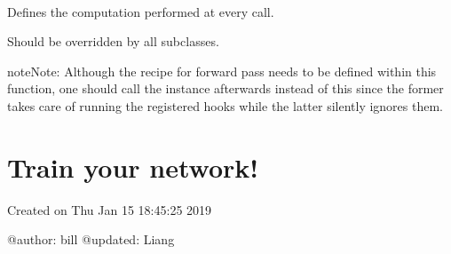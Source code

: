 \documentclass[letterpaper,10pt,english]{sphinxmanual}
\begin{document}

\begin{fulllineitems}
\label{\detokenize{usage/quickstart:unet.UNet_up_block}}~

\begin{fulllineitems}
\label{\detokenize{usage/quickstart:unet.UNet_up_block.forward}}
Defines the computation performed at every call.

Should be overridden by all subclasses.

\begin{sphinxadmonition}{note}{Note:}
Although the recipe for forward pass needs to be defined within
this function, one should call the  instance afterwards
instead of this since the former takes care of running the
registered hooks while the latter silently ignores them.
\end{sphinxadmonition}

\end{fulllineitems}


\end{fulllineitems}



\chapter{Train your network!}
\label{\detokenize{usage/train:module-train_unet}}\label{\detokenize{usage/train:train-your-network}}\label{\detokenize{usage/train::doc}}
Created on Thu Jan 15 18:45:25 2019

@author: bill
@updated: Liang
\end{document}
